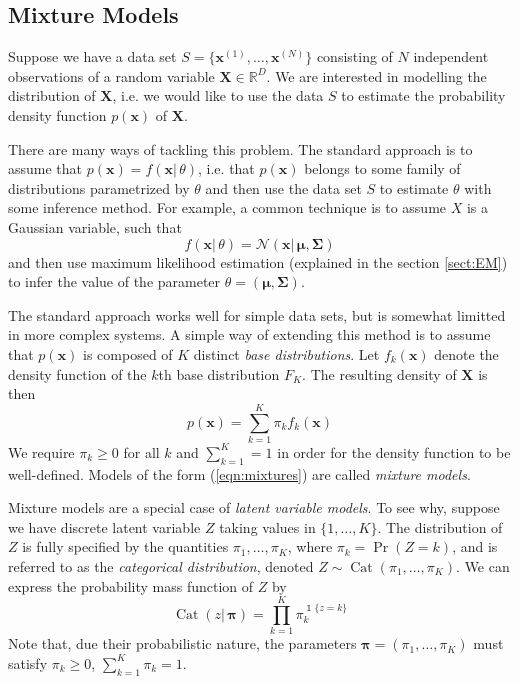 \documentclass[final,3p,times,twocolumn]{elsarticle}
\DeclareMathOperator*{\Cat}{Cat}
\let\bs\boldsymbol
\DeclareMathOperator*{\id}{\mathds{1}}
\begin{document}
\subsection{Mixture Models}
\label{sect:mixtures}
Suppose we have a data set $S = \{\bs x^{(1)},\dots,\bs x^{(N)}\}$ consisting of $N$ independent observations of a random variable $\bs X \in \mathbb{R}^D$.
We are interested in modelling the distribution of $\bs X$, i.e. we would like to use the data $S$ to estimate the probability density function $p(\bs x)$ of $\bs X$.

There are many ways of tackling this problem. 
The standard approach is to assume that $p(\bs x) = f(\bs x|\,\theta)$, i.e. that $p(\bs x)$ belongs to some family of distributions parametrized by $\theta$ and then use the data set $S$ to estimate $\theta$ with some inference method.
For example, a common technique is to assume $X$ is a Gaussian variable, such that 
\begin{equation*}
f(\bs x |\,\theta) = \mathcal{N}(\bs x|\,\bs\mu,\bs \Sigma)
\end{equation*}
and then use maximum likelihood estimation (explained in the section \ref{sect:EM}) to infer the value of the parameter $\theta = (\bs\mu,\bs\Sigma)$.

The standard approach works well for simple data sets, but is somewhat limitted in more complex systems.
A simple way of extending this method is to assume that $p(\bs x)$ is composed of $K$ distinct \emph{base distributions}.
Let $f_k(\bs x)$ denote the density function of the $k$th base distribution $F_K$.
The resulting density of $\bs X$ is then
\begin{equation}
\label{eqn:mixtures}
p(\bs x) = \sum_{k=1}^K \pi_k f_k(\bs x)
\end{equation}
We require $\pi_k \geq 0$ for all $k$ and $\sum_{k=1}^K = 1$ in order for the density function to be well-defined.
Models of the form (\ref{eqn:mixtures}) are called \emph{mixture models}.

Mixture models are a special case of \emph{latent variable models}.
To see why, suppose we have discrete latent variable $Z$ taking values in $\{1,\dots,K\}$.
The distribution of $Z$ is fully specified by the quantities $\pi_1,\dots,\pi_K$, where $\pi_k = \Pr(Z = k)$, and is referred to as the \emph{categorical distribution}, denoted $Z \sim \Cat(\pi_1, \dots,\pi_K)$.
We can express the probability mass function of $Z$ by
\begin{equation*}
\Cat(z|\,\bs\pi) = \prod_{k=1}^K \pi_k^{\id\{z=k\}}
\end{equation*}
Note that, due their probabilistic nature, the parameters $\bs \pi = (\pi_1,\dots,\pi_K)$ must satisfy $\pi_k \geq 0$, $\sum_{k=1}^K \pi_k = 1$.
\end{document}
